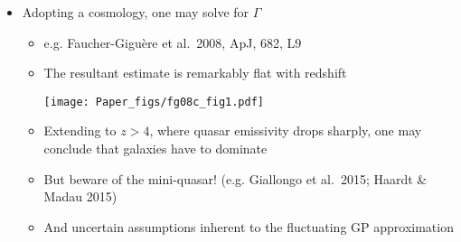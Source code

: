 \documentclass[12pt,letterpaper]{article}
\begin{document}
\begin{Aenumerate}
\begin{itemize}
\begin{equation}
	\end{equation}
		\begin{itemize}
		\item See Miralda-Escud\'e et al.\ 2000 for models of $P(\Delta)$
		based on numerical simulations
		\end{itemize}
	\item Adopting a cosmology, one may solve for $\Gamma$
		\begin{itemize}
		\item e.g. Faucher-Gigu\`ere et al.\ 2008, ApJ, 682, L9
		\item The resultant estimate is remarkably flat with redshift

	\texttt{[image: Paper\_figs/fg08c\_fig1.pdf]}

		\item Extending to $z>4$, where quasar emissivity drops sharply,
		one may conclude that galaxies have to dominate
		\item But beware of the mini-quasar! (e.g. Giallongo et al.\ 2015; Haardt \& Madau 2015)
		\item And uncertain assumptions inherent to the fluctuating GP approximation
		\end{itemize}

	\end{itemize}


\end{Aenumerate}
\end{document}
